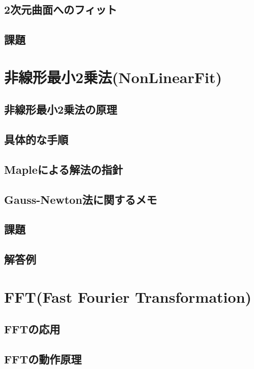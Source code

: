\section{2次元曲面へのフィット}
 
\section{課題}
 


\chapter{非線形最小2乗法(NonLinearFit)}
\section{非線形最小2乗法の原理}
 
\section{具体的な手順}
 
\section{Mapleによる解法の指針}
 
\section{Gauss-Newton法に関するメモ}
 
\section{課題}
 
\section{解答例}
 

\chapter{FFT(Fast Fourier Transformation)}
\section{FFTの応用}
 
\section{FFTの動作原理}
 
